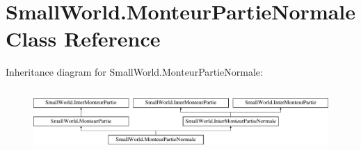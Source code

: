 \hypertarget{class_small_world_1_1_monteur_partie_normale}{\section{Small\-World.\-Monteur\-Partie\-Normale Class Reference}
\label{class_small_world_1_1_monteur_partie_normale}
}
Inheritance diagram for Small\-World.\-Monteur\-Partie\-Normale\-:\begin{figure}[H]
\begin{center}
\leavevmode
\includegraphics[height=2.343096cm]{class_small_world_1_1_monteur_partie_normale}
\end{center}
\end{figure}
